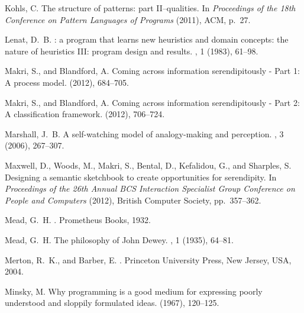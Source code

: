 \documentclass{llncs}
\begin{document}
\begin{thebibliography}{10}
{\sc Kohls, C.}
\newblock The structure of patterns: part {II}--qualities.
\newblock In {\em {P}roceedings of the 18th {C}onference on {P}attern
  {L}anguages of {P}rograms\/} (2011), ACM, p.~27.

{\sc Lenat, D.~B.}
: a program that learns new heuristics and domain concepts:
  the nature of heuristics {III}: program design and results.
, 1 (1983), 61--98.

{\sc Makri, S., and Blandford, A.}
\newblock Coming across information serendipitously - {P}art 1: A process
  model.
 (2012), 684--705.

{\sc Makri, S., and Blandford, A.}
\newblock Coming across information serendipitously - {P}art 2: A
  classification framework.
 (2012), 706--724.

{\sc Marshall, J.~B.}
\newblock A self-watching model of analogy-making and perception.
, 3 (2006), 267--307.

{\sc Maxwell, D., Woods, M., Makri, S., Bental, D., Kefalidou, G., and
  Sharples, S.}
\newblock Designing a semantic sketchbook to create opportunities for
  serendipity.
\newblock In {\em Proceedings of the 26th Annual BCS Interaction Specialist
  Group Conference on People and Computers\/} (2012), British Computer Society,
  pp.~357--362.

{\sc Mead, G.~H.}
.
\newblock Prometheus Books, 1932.

{\sc Mead, G.~H.}
\newblock The philosophy of {J}ohn {D}ewey.
, 1 (1935), 64--81.

{\sc Merton, R.~K., and Barber, E.}
.
\newblock Princeton University Press, New Jersey, USA, 2004.

{\sc Minsky, M.}
\newblock Why programming is a good medium for expressing poorly understood and
  sloppily formulated ideas.
  (1967), 120--125.


\end{thebibliography}
\end{document}
